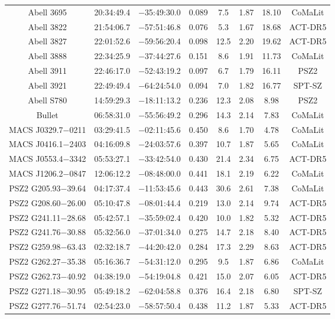 \begin{table}
\begin{tabular}{cccccccc}
Abell 3695 & 20:34:49.4 & $-$35:49:30.0 & 0.089 & 7.5 & 1.87 & 18.10 & CoMaLit \\
Abell 3822 & 21:54:06.7 & $-$57:51:46.8 & 0.076 & 5.3 & 1.67 & 18.68 & ACT-DR5 \\
Abell 3827 & 22:01:52.6 & $-$59:56:20.4 & 0.098 & 12.5 & 2.20 & 19.62 & ACT-DR5 \\
Abell 3888 & 22:34:25.9 & $-$37:44:27.6 & 0.151 & 8.6 & 1.91 & 11.73 & CoMaLit \\
Abell 3911 & 22:46:17.0 & $-$52:43:19.2 & 0.097 & 6.7 & 1.79 & 16.11 & PSZ2 \\
Abell 3921 & 22:49:49.4 & $-$64:24:54.0 & 0.094 & 7.0 & 1.82 & 16.77 & SPT-SZ \\
Abell S780 & 14:59:29.3 & $-$18:11:13.2 & 0.236 & 12.3 & 2.08 & 8.98 & PSZ2 \\
Bullet & 06:58:31.0 & $-$55:56:49.2 & 0.296 & 14.3 & 2.14 & 7.83 & CoMaLit \\
MACS J0329.7$-$0211 & 03:29:41.5 & $-$02:11:45.6 & 0.450 & 8.6 & 1.70 & 4.78 & CoMaLit \\
MACS J0416.1$-$2403 & 04:16:09.8 & $-$24:03:57.6 & 0.397 & 10.7 & 1.87 & 5.65 & CoMaLit \\
MACS J0553.4$-$3342 & 05:53:27.1 & $-$33:42:54.0 & 0.430 & 21.4 & 2.34 & 6.75 & ACT-DR5 \\
MACS J1206.2$-$0847 & 12:06:12.2 & $-$08:48:00.0 & 0.441 & 18.1 & 2.19 & 6.22 & CoMaLit \\
PSZ2 G205.93$-$39.64 & 04:17:37.4 & $-$11:53:45.6 & 0.443 & 30.6 & 2.61 & 7.38 & CoMaLit \\
PSZ2 G208.60$-$26.00 & 05:10:47.8 & $-$08:01:44.4 & 0.219 & 13.0 & 2.14 & 9.74 & ACT-DR5 \\
PSZ2 G241.11$-$28.68 & 05:42:57.1 & $-$35:59:02.4 & 0.420 & 10.0 & 1.82 & 5.32 & ACT-DR5 \\
PSZ2 G241.76$-$30.88 & 05:32:56.0 & $-$37:01:34.0 & 0.275 & 14.7 & 2.18 & 8.40 & ACT-DR5 \\
PSZ2 G259.98$-$63.43 & 02:32:18.7 & $-$44:20:42.0 & 0.284 & 17.3 & 2.29 & 8.63 & ACT-DR5 \\
PSZ2 G262.27$-$35.38 & 05:16:36.7 & $-$54:31:12.0 & 0.295 & 9.5 & 1.87 & 6.86 & CoMaLit \\
PSZ2 G262.73$-$40.92 & 04:38:19.0 & $-$54:19:04.8 & 0.421 & 15.0 & 2.07 & 6.05 & ACT-DR5 \\
PSZ2 G271.18$-$30.95 & 05:49:18.2 & $-$62:04:58.8 & 0.376 & 16.4 & 2.18 & 6.80 & SPT-SZ \\
PSZ2 G277.76$-$51.74 & 02:54:23.0 & $-$58:57:50.4 & 0.438 & 11.2 & 1.87 & 5.33 & ACT-DR5 \\

\end{tabular}
\end{table}
